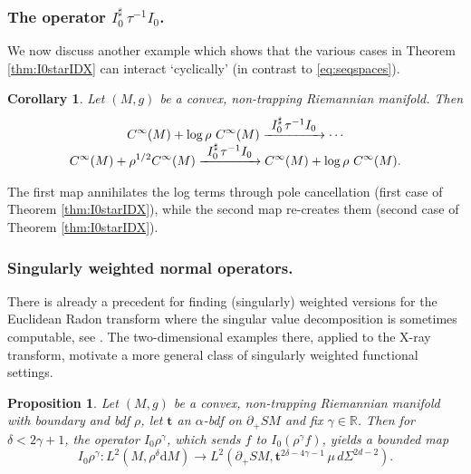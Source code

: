 \documentclass[JEP,XML,SOM,Unicode,NoFloatCountersInSection, NoEqCountersInSection,published]{cedram}
\def\To#1{\mathchoice{\xrightarrow{\textstyle\kern4pt#1\kern3pt}}{\stackrel{#1}{\longrightarrow}}{}{}}
\theoremstyle{plain}
\newtheorem{Corollary}[Theorem]{Corollary}
\newtheorem{Proposition}[Theorem]{Proposition}
\theoremstyle{definition}
\theoremstyle{remark}
\def\Rm{{\mathbb{R}}}
\newcommand{\bt}{{\boldsymbol{t}}}
\newcommand{\adj}{I_0^\sharp}
\newcommand {\dM}{\mathrm{d}M}
\begin{document}
\subsubsection*{The operator $\adj \, \tau^{-1} I_0$.}
We now discuss another example which shows that the various cases in Theorem \ref{thm:I0starIDX} can interact `cyclically' (in contrast to \eqref{eq:seqspaces}).

\begin{Corollary}
Let $(M,g)$ be a convex, non-trapping Riemannian manifold. Then
\begin{multline*}
C^\infty(M) + \log\rho\ C^\infty(M) \To{\adj \, \tau^{-1} I_0} \cdots\\[-5pt]
C^\infty(M) + \rho^{1/2} C^\infty (M) \To{\adj \, \tau^{-1} I_0} C^\infty(M) + \log\rho\ C^\infty(M).
\end{multline*}
\end{Corollary}
The first map annihilates the log terms through pole cancellation (first case of Theorem \ref{thm:I0starIDX}), while the second map re-creates them (second case of Theorem \ref{thm:I0starIDX}).

\subsubsection*{Singularly weighted normal operators.}

There is already a precedent for finding (singularly) weighted versions for the Euclidean Radon transform where the singular value decomposition
is sometimes computable, see \eg \cite{Louis1984}. The two-dimensional examples there, applied to the X-ray transform, motivate a more
general class of singularly weighted functional settings.

\begin{Proposition}\label{prop:weightedI0}
Let $(M,g)$ be a convex, non-trapping Riemannian manifold with boundary and bdf $\rho$, let $\bt$ an $\alpha$-bdf on $\partial_+ SM$ and fix $\gamma\in\Rm$. Then
for $\delta<2\gamma+1$, the operator $I_0 \rho^\gamma$, which sends $f$ to $I_0 (\rho^\gamma f)$, yields a bounded map
\begin{equation*}
I_0 \rho^{\gamma} \colon L^2(M, \rho^{\delta}\dM) \to L^2(\partial_+ SM, \bt^{2\delta-4\gamma-1}\, \mu \, d\Sigma^{2d-2}).
\end{equation*}
\end{Proposition}
\end{document}
